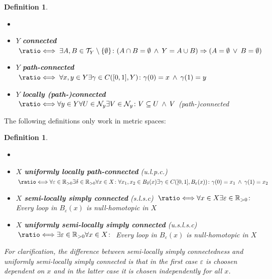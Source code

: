 \documentclass[a4paper, 11pt, twoside]{article}
\newcommand{\R}[0]{\mathbb{R}}
\newcommand{\T}[0]{\mathcal{T}}
\newcommand{\NB}[0]{\mathcal{N}}
\newcommand*{\longeq}{\ratio\Longleftrightarrow}
\theoremstyle{break}
\theoremstyle{break}
\newtheorem{defin}[thm]{Definition}
\begin{document}
\begin{defin} \label{def:connectedness}
  \begin{itemize}
    \item[] %
    \item $Y$ \textbf{connected} $\;\longeq\; \exists A,B \in \T_Y\setminus \{\emptyset\}\colon (A \cap B = \emptyset \: \land \: Y = A \cup B) \Rightarrow (A = \emptyset \: \lor \: B = \emptyset)$
    \item $Y$ \textbf{path-connected} $\;\longeq\; \forall x,y \in Y \exists\gamma \in C([0,1], Y)\colon \gamma(0) = x \: \land \: \gamma(1) = y$
    \item $Y$ \textbf{locally (path-)connected} $\;\longeq \\ \forall y \in Y\forall U \in \NB_y\exists V\in \NB_y\colon V \subseteq U \: \land \: V$ (path-)connected
  \end{itemize}
\end{defin}

The following definitions only work in metric spaces:

\begin{defin}
  \begin{itemize}
    \item[] %
    \item $X$ \textbf{uniformly locally path-connected} (u.l.p.c.) $\: \longeq \\ \forall \varepsilon \in \R_{>0} \exists \delta \in \R_{>0}\forall x \in X\colon \forall x_1, x_2 \in B_{\delta}(x)\exists \gamma \in C([0,1], B_{\varepsilon}(x))\colon \gamma(0) = x_1 \: \land \: \gamma(1) = x_2$
    \item $X$ \textbf{semi-locally simply connected} (s.l.s.c) $\: \longeq \\ \forall x\in X\exists \varepsilon \in \R_{>0}\colon$ Every loop in $B_{\varepsilon}(x)$ is null-homotopic in $X$
    \item $X$ \textbf{uniformly semi-locally simply connected} (u.s.l.s.c) $\: \longeq \\ \exists \varepsilon \in \R_{>0}\forall x\in X\colon$ Every loop in $B_{\varepsilon}(x)$ is null-homotopic in $X$
  \end{itemize}
  \vspace*{10pt}
  For clarification, the difference between semi-locally simply connectedness and uniformly semi-locally simply connected is 
  that in the first case $\varepsilon$ is choosen dependent on $x$ and in the latter case it is chosen independently for all $x$.
\end{defin}
\end{document}
